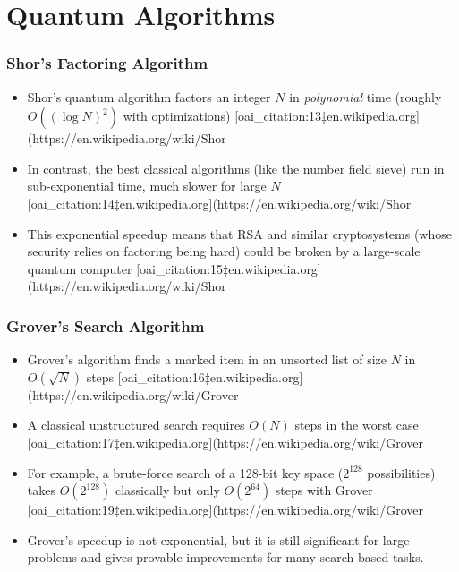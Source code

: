 \documentclass{beamer}
\begin{document}
\section{Quantum Algorithms}
\begin{frame}
\frametitle{Shor's Factoring Algorithm}
\begin{itemize}
  \item Shor's quantum algorithm factors an integer $N$ in {\em polynomial} time (roughly $O((\log N)^2)$ with optimizations) [oai_citation:13‡en.wikipedia.org](https://en.wikipedia.org/wiki/Shor%
  \item In contrast, the best classical algorithms (like the number field sieve) run in sub-exponential time, much slower for large $N$ [oai_citation:14‡en.wikipedia.org](https://en.wikipedia.org/wiki/Shor%
  \item This exponential speedup means that RSA and similar cryptosystems (whose security relies on factoring being hard) could be broken by a large-scale quantum computer [oai_citation:15‡en.wikipedia.org](https://en.wikipedia.org/wiki/Shor%
\end{itemize}
\end{frame}

\begin{frame}
\frametitle{Grover's Search Algorithm}
\begin{itemize}
  \item Grover's algorithm finds a marked item in an unsorted list of size $N$ in $O(\sqrt{N})$ steps [oai_citation:16‡en.wikipedia.org](https://en.wikipedia.org/wiki/Grover%
  \item A classical unstructured search requires $O(N)$ steps in the worst case [oai_citation:17‡en.wikipedia.org](https://en.wikipedia.org/wiki/Grover%
  \item For example, a brute-force search of a 128-bit key space ($2^{128}$ possibilities) takes $O(2^{128})$ classically but only $O(2^{64})$ steps with Grover [oai_citation:19‡en.wikipedia.org](https://en.wikipedia.org/wiki/Grover%
  \item Grover’s speedup is not exponential, but it is still significant for large problems and gives provable improvements for many search-based tasks.
\end{itemize}
\end{frame}
\end{document}
